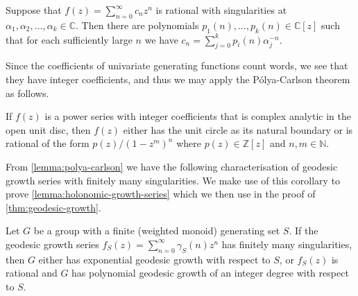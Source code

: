 \begin{lemma}\label{lemma:rational-polynomial-exponential}
	Suppose that $f(z) = \sum_{n=0}^\infty c_n z^n$ is rational with singularities at $\alpha_1,\alpha_2,\ldots,\alpha_k \in \mathbb{C}$.
	Then there are polynomials $p_1(n),\ldots,p_k(n)\in \mathbb{C}[z]$ such that for each sufficiently large $n$ we have $c_n = \sum_{j = 0}^k p_i(n) \alpha_j^{-n}$.
\end{lemma}

Since the coefficients of univariate generating functions count words, we see that they have integer coefficients, and thus we may apply the P\'olya-Carlson theorem as follows.

\begin{lemma}\label{lemma:polya-carlson}
	If $f(z)$ is a power series with integer coefficients that is complex analytic in the open unit disc, then $f(z)$ either has the unit circle as its natural boundary or is rational of the form $p(z)/(1-z^m)^n$ where $p(z) \in \mathbb{Z}[z]$ and $n,m \in \mathbb{N}$.
\end{lemma}

From \cref{lemma:polya-carlson} we have the following characterisation of geodesic growth series with finitely many singularities.
We make use of this corollary to prove \cref{lemma:holonomic-growth-series} which we then use in the proof of \cref{thm:geodesic-growth}.

\begin{corollary}\label{cor:dichotomy-of-characterisation}
	Let $G$ be a group with a finite (weighted monoid) generating set $S$.
	If the geodesic growth series $f_S(z) = \sum_{n=0}^\infty \gamma_S(n) z^n$ has finitely many singularities, then $G$ either has exponential geodesic growth with respect to $S$, or  $f_S(z)$ is rational and $G$ has polynomial geodesic growth of an integer degree with respect to $S$.
\end{corollary}

